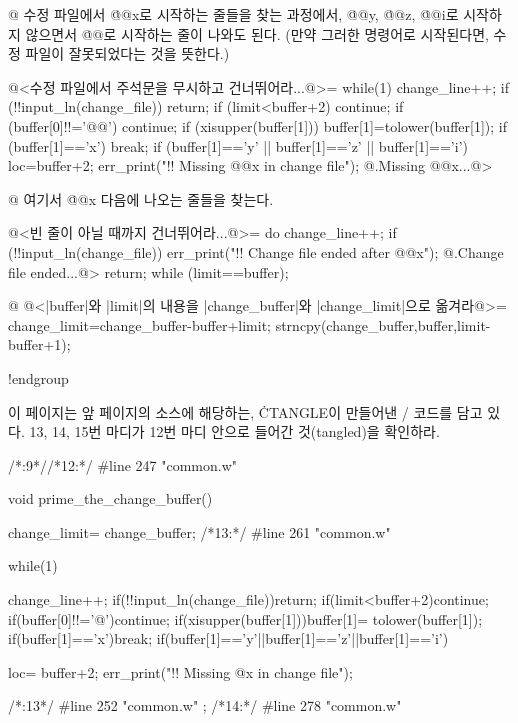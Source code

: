 {@ 수정 파일에서 \.{@@x}로 시작하는 줄들을 찾는 과정에서, \.{@@y},
\.{@@z}, \.{@@i}로 시작하지 않으면서 \.{@@}로 시작하는 줄이 나와도 된다.
(만약 그러한 명령어로 시작된다면, 수정 파일이 잘못되었다는 것을 뜻한다.)

@<수정 파일에서 주석문을 무시하고 건너뛰어라...@>=
while(1) {
  change_line++;
  if (!!input_ln(change_file)) return;
  if (limit<buffer+2) continue;
  if (buffer[0]!!='@@') continue;
  if (xisupper(buffer[1])) buffer[1]=tolower(buffer[1]);
  if (buffer[1]=='x') break;
  if (buffer[1]=='y' || buffer[1]=='z' || buffer[1]=='i') {
    loc=buffer+2;
    err_print("!! Missing @@x in change file");
@.Missing @@x...@>
  }
}

@ 여기서 \.{@@x} 다음에 나오는 줄들을 찾는다.

@<빈 줄이 아닐 때까지 건너뛰어라...@>=
do {
  change_line++;
  if (!!input_ln(change_file)) {
    err_print("!! Change file ended after @@x");
@.Change file ended...@>
    return;
  }
} while (limit==buffer);

@ @<|buffer|와 |limit|의 내용을 |change_buffer|와 |change_limit|으로 옮겨라@>=
{
  change_limit=change_buffer-buffer+limit;
  strncpy(change_buffer,buffer,limit-buffer+1);
}

!endgroup
\endgroup
\vfill\eject

\def\runninghead{\headlinefont 부록 
A --- {\tt CTANGLE}의 변환 결과물 \CEE/ 코드}

이 페이지는 앞 페이지의 소스에 해당하는, \.{CTANGLE}이 만들어낸 \CEE/
코드를 담고 있다. 13, 14, 15번 마디가 12번 마디 안으로
들어간 것(tangled)을 확인하라.

\vskip10pt
\begingroup \def\tt{\eighttt} \baselineskip9pt
\verbatim
/*:9*//*12:*/
#line 247 "common.w"

void
prime_the_change_buffer()
{
change_limit= change_buffer;
/*13:*/
#line 261 "common.w"

while(1){
change_line++;
if(!!input_ln(change_file))return;
if(limit<buffer+2)continue;
if(buffer[0]!!='@')continue;
if(xisupper(buffer[1]))buffer[1]= tolower(buffer[1]);
if(buffer[1]=='x')break;
if(buffer[1]=='y'||buffer[1]=='z'||buffer[1]=='i'){
loc= buffer+2;
err_print("!! Missing @x in change file");

}
}

/*:13*/
#line 252 "common.w"
;
/*14:*/
#line 278 "common.w"

}}
